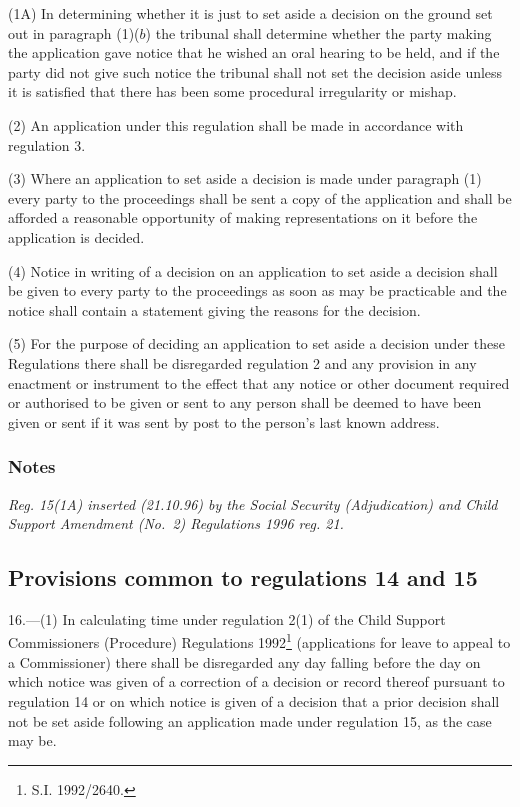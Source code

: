 \documentclass[a4paper]{article}
\newcommand\amendment[1]{\subsubsection*{Notes}{\itshape\frenchspacing\footnotesize #1 \par}}
\begin{document}
(1A) In determining whether it is just to set aside a decision on the ground set out in paragraph (1)($b$) the tribunal shall determine whether the party making the application gave notice that he wished an oral hearing to be held, and if the party did not give such notice the tribunal shall not set the decision aside unless it is satisfied that there has been some procedural irregularity or mishap.

(2) An application under this regulation shall be made in accordance with regulation 3.

(3) Where an application to set aside a decision is made under paragraph (1) every party to the proceedings shall be sent a copy of the application and shall be afforded a reasonable opportunity of making representations on it before the application is decided.

(4) Notice in writing of a decision on an application to set aside a decision shall be given to every party to the proceedings as soon as may be practicable and the notice shall contain a statement giving the reasons for the decision.

(5) For the purpose of deciding an application to set aside a decision under these Regulations there shall be disregarded regulation 2 and any provision in any enactment or instrument to the effect that any notice or other document required or authorised to be given or sent to any person shall be deemed to have been given or sent if it was sent by post to the person’s last known address.

\amendment{
Reg. 15(1A) inserted (21.10.96) by the Social Security (Adjudication) and Child Support Amendment (No.\ 2) Regulations 1996 reg. 21.
}

\subsection[16. Provisions common to regulations 14 and 15]{Provisions common to regulations 14 and 15}

16.—(1) In calculating time under regulation 2(1) of the Child Support Commissioners (Procedure) Regulations 1992\footnote{\frenchspacing S.I. 1992/2640.} (applications for leave to appeal to a Commissioner) there shall be disregarded any day falling before the day on which notice was given of a correction of a decision or record thereof pursuant to regulation 14 or on which notice is given of a decision that a prior decision shall not be set aside following an application made under regulation 15, as the case may be.
\end{document}
